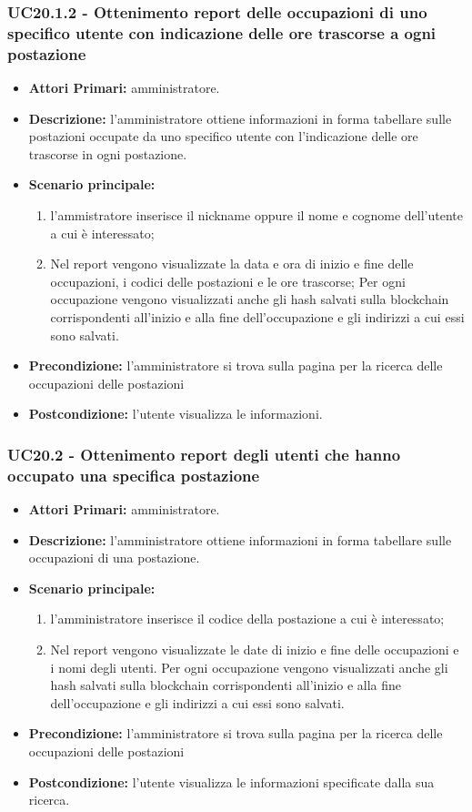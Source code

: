 \subsubsection{ UC20.1.2 - Ottenimento report delle occupazioni di uno specifico utente con indicazione delle ore trascorse a ogni postazione}
\begin{itemize}
	\item\textbf{Attori Primari:} 
	amministratore.
	\item\textbf{Descrizione:} 
	l'amministratore ottiene informazioni in forma tabellare sulle postazioni occupate da uno specifico utente con l'indicazione delle ore trascorse in ogni postazione.
	\item\textbf{Scenario principale:}
	\begin{enumerate}
		\item l'ammistratore inserisce il nickname oppure il nome e cognome dell'utente a cui è interessato;
		\item Nel report vengono visualizzate la data e ora di inizio e fine delle occupazioni, i codici delle postazioni e le ore trascorse;
		Per ogni occupazione vengono visualizzati anche gli hash salvati sulla blockchain corrispondenti all'inizio e alla fine dell'occupazione e gli indirizzi a cui essi sono salvati.
	\end{enumerate}
	\item\textbf{Precondizione:} 
	l'amministratore si trova sulla pagina per la ricerca delle occupazioni delle postazioni
	\item\textbf{Postcondizione:}
	l'utente visualizza le informazioni.
\end{itemize}

\subsubsection{ UC20.2 - Ottenimento report degli utenti che hanno occupato una specifica postazione}
\begin{itemize}
	\item\textbf{Attori Primari:} 
	amministratore.
	\item\textbf{Descrizione:} 
	l'amministratore ottiene informazioni in forma tabellare sulle occupazioni di una postazione.
	\item\textbf{Scenario principale:} 
	\begin{enumerate}
		\item l'amministratore inserisce il codice della postazione a cui è interessato;
		\item Nel report vengono visualizzate le date di inizio e fine delle occupazioni e i nomi degli utenti. Per ogni occupazione vengono visualizzati anche gli hash salvati sulla blockchain corrispondenti all'inizio e alla fine dell'occupazione e gli indirizzi a cui essi sono salvati.
	\end{enumerate}
	\item\textbf{Precondizione:} 
	l'amministratore si trova sulla pagina per la ricerca delle occupazioni delle postazioni
	\item\textbf{Postcondizione:}
	l'utente visualizza le informazioni specificate dalla sua ricerca.
\end{itemize}

